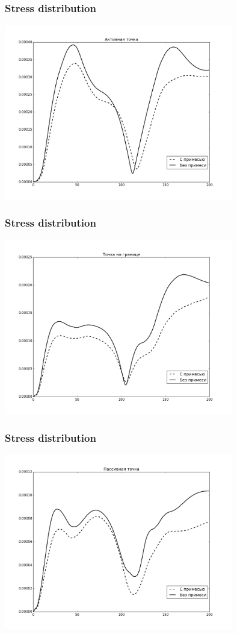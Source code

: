\documentclass[14pt]{beamer}
\begin{document}
\begin{frame}
\frametitle{Stress distribution}
    \begin{center}
        \includegraphics[width=10cm]{forces_active_point.png}
    \end{center}
\end{frame}

\begin{frame}
\frametitle{Stress distribution}
    \begin{center}
        \includegraphics[width=10cm]{forces_boundary_point.png}
    \end{center}
\end{frame}

\begin{frame}
\frametitle{Stress distribution}
    \begin{center}
        \includegraphics[width=10cm]{forces_passive_point.png}
    \end{center}
\end{frame}
\end{document}
